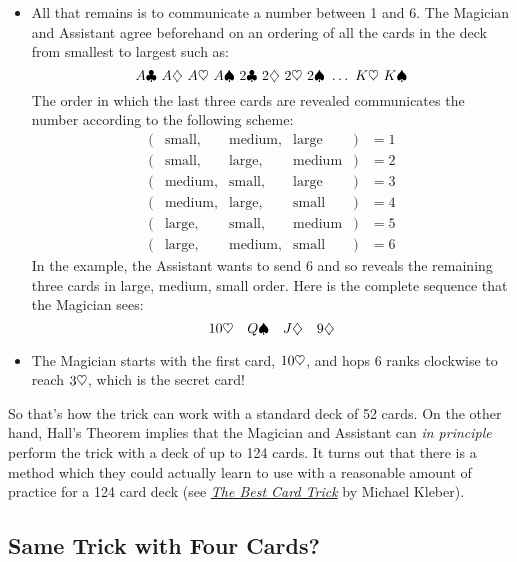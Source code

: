 \begin{itemize}
\item All that remains is to communicate a number between 1 and 6.
The Magician and Assistant agree beforehand on an ordering of all the
cards in the deck from smallest to largest such as:
%
\[
A \clubsuit\  A \diamondsuit\  A \heartsuit\ A \spadesuit\
2 \clubsuit\  2 \diamondsuit\  2 \heartsuit\ 2 \spadesuit\
\dots\ K \heartsuit\ K \spadesuit
\]
%
The order in which the last three cards are revealed communicates the
number according to the following scheme:
%
\[
\begin{array}{rcccll}
(&\text{small},&\text{medium},&\text{large}&) & = 1 \\
(&\text{small},&\text{large},&\text{medium}&) & = 2 \\
(&\text{medium},&\text{small},&\text{large}&) & = 3 \\
(&\text{medium},&\text{large},&\text{small}&) & = 4 \\
(&\text{large},&\text{small},&\text{medium}&) & = 5 \\
(&\text{large},&\text{medium},&\text{small}&) & = 6
\end{array}
\]
%
In the example, the Assistant wants to send 6 and so reveals the
remaining three cards in large, medium, small order.  Here is the
complete sequence that the Magician sees:
%
\[
10 \heartsuit \quad Q \spadesuit \quad J \diamondsuit \quad 9 \diamondsuit
\]

\item The Magician starts with the first card, $10 \heartsuit$, and hops 6
ranks clockwise to reach $3 \heartsuit$, which is the secret card!

\end{itemize}

So that's how the trick can work with a standard deck of 52 cards.  On the
other hand, Hall's Theorem implies that the Magician and Assistant can
\emph{in principle} perform the trick with a deck of up to 124 cards.  It
turns out that there is a method which they could actually learn to use
with a reasonable amount of practice for a 124 card deck (see
\href{http://courses.csail.mit.edu/6.042/fall09/cardTrick.pdf}{\emph{The Best
    Card Trick}} by Michael Kleber).

\iffalse
http://people.brandeis.edu/~kleber/Papers/card.pdf

Also, \emph{Using a Card Trick to Teach Discrete Mathematics}, Simonson,
Shai, Holm, Tara S., Primus: Problems, Resources, and Issues in
Mathematics Undergraduate Studies, Sep 2003.
\fi

\subsection{Same Trick with Four Cards?}

